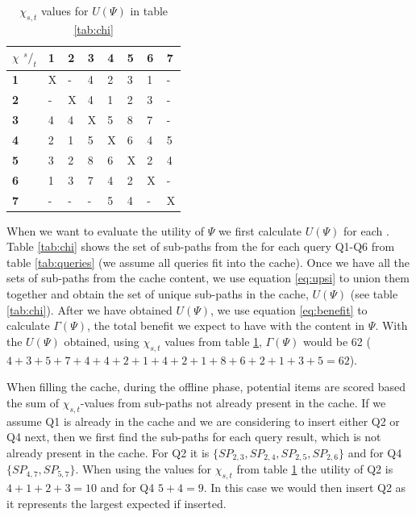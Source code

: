 \begin{table}
\center
\begin{tabular}{|l||l|l|l|l|l|l|l|}
\textbf{$\chi$ ${^s/_t}$}& \textbf{1}	& \textbf{2}	& \textbf{3}	& \textbf{4}	& \textbf{5}	& \textbf{6}	& \textbf{7} \\\hline
\textbf{1}	& X	& -	& 4	& 2	& 3	& 1	& -	 \\
\textbf{2}	& -	& X	& 4	& 1	& 2	& 3	& -	 \\
\textbf{3}	& 4	& 4	& X	& 5	& 8	& 7	& -	 \\
\textbf{4}	& 2	& 1	& 5	& X	& 6	& 4	& 5	 \\
\textbf{5}	& 3	& 2	& 8	& 6	& X	& 2	& 4	 \\
\textbf{6}	& 1	& 3	& 7	& 4	& 2	& X	& -	 \\
\textbf{7}	& -	& -	& -	& 5	& 4	& -	& X	 \\
\end{tabular}
\caption{$\chi_{s,t}$ values for $U(\Psi)$ in table \ref{tab:chi}}
\label{tab:freq}
\end{table}



When we want to evaluate the utility of $\Psi$ we first calculate $U(\Psi)$ for each \spath. Table \ref{tab:chi} shows the set of sub-paths from the \spaths for each query Q1-Q6 from table \ref{tab:queries} (we assume all queries fit into the cache). Once we have all the sets of sub-paths from the cache content, we use equation \ref{eq:upsi} to union them together and obtain the set of unique sub-paths in the cache, $U(\Psi)$ (see table \ref{tab:chi}). After we have obtained $U(\Psi)$, we use equation \ref{eq:benefit} to calculate $\Gamma(\Psi)$, the total benefit we expect to have with the content in $\Psi$. With the $U(\Psi)$ obtained, using $\chi_{s,t}$ values from table \ref{tab:freq}, $\Gamma(\Psi)$ would be 62 ($4+3+5+7+4+4+2+1+4+2+1+8+6+2+1+3+5 = 62$).

When filling the cache, during the offline phase, potential \spath items are scored based the sum of $\chi_{s,t}$-values from sub-paths not already present in the cache. If we assume Q1 is already in the cache and we are considering to insert either Q2 or Q4 next, then we first find the sub-paths for each query result, which is not already present in the cache. For Q2 it is $\{SP_{2,3},SP_{2,4},SP_{2,5},SP_{2,6}\}$ and for Q4 $\{SP_{4,7},SP_{5,7}\}$. When using the values for $\chi_{s,t}$ from table \ref{tab:freq} the utility of Q2 is $4+1+2+3=10$ and for Q4 $5+4=9$. In this case we would then insert Q2 as it represents the largest expected if inserted.

